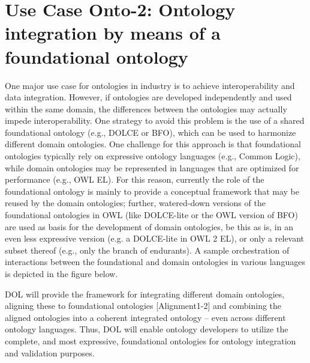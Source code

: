 \documentclass[10pt,%
\ifpretendfinal
final%
\else
draft%
\fi,
]{scrreprt}
\begin{document}
\section{Use Case Onto-2: Ontology integration by means of a foundational ontology}
One major use case for ontologies in industry is to achieve interoperability and data integration. However, if ontologies are developed independently and used 
within the same domain, the differences between the ontologies may actually impede interoperability. One strategy to avoid this problem is the use of a shared 
foundational ontology (e.g., DOLCE or BFO), which can be used to harmonize different domain ontologies. One challenge for this approach is that foundational 
ontologies typically rely on expressive ontology languages (e.g., Common Logic), while domain ontologies may be represented in languages that are optimized for 
performance (e.g., OWL EL). For this reason, currently the role of the foundational ontology is mainly to provide a conceptual framework that may be reused by the 
domain ontologies; further, watered-down versions of the foundational ontologies in OWL (like DOLCE-lite or the OWL version of BFO) are used as basis for the 
development of domain ontologies, be this as is, in an even less expressive version (e.g. a DOLCE-lite in OWL 2 EL), or only a relevant subset thereof (e.g., only 
the branch of endurants). A sample orchestration of interactions between the foundational and domain ontologies in various languages is depicted in the figure below. 

DOL will provide the framework for integrating different domain ontologies, aligning these to foundational ontologies [Alignment1-2] and 
combining the aligned ontologies into a coherent integrated ontology -- even across different ontology languages. Thus, DOL will enable 
ontology developers to utilize the complete, and most expressive, foundational ontologies for ontology integration and validation purposes. 


 
\end{document}
